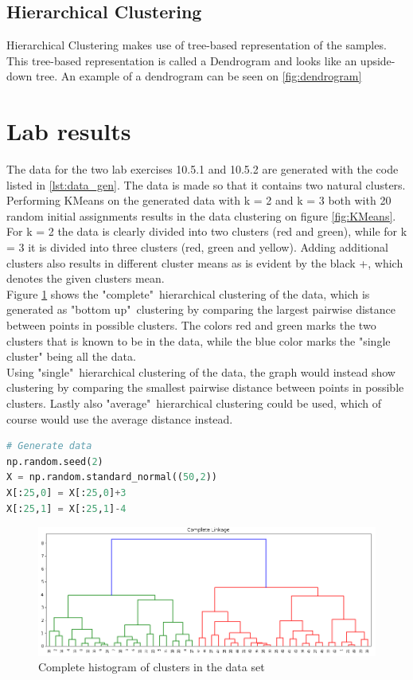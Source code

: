 \subsection{Hierarchical Clustering}
Hierarchical Clustering makes use of tree-based representation of the samples. This tree-based representation is called a Dendrogram and looks like an upside-down tree. An example of a dendrogram can be seen on \cref{fig:dendrogram}\cite{book_2015}


\section{Lab results}

The data for the two lab exercises 10.5.1 and 10.5.2 are generated with the code listed in \ref{lst:data_gen}. The data is made so that it contains two natural clusters.\\ 
Performing KMeans on the generated data with k = 2 and k = 3 both with 20 random initial assignments results in the data clustering on figure \ref{fig:KMeans}. For k = 2 the data is clearly divided into two clusters (red and green), while for k = 3 it is divided into three clusters (red, green and yellow). Adding additional clusters also results in different cluster means as is evident by the black +, which denotes the given clusters mean.\\
Figure \ref{fig:HC_Complete} shows the "complete"\ hierarchical clustering of the data, which is generated as "bottom up"\ clustering by comparing the largest pairwise distance between points in possible clusters. The colors red and green marks the two clusters that is known to be in the data, while the blue color marks the "single cluster" being all the data.\\ 
Using "single"\ hierarchical clustering of the data, the graph would instead show clustering by comparing the smallest pairwise distance between points in possible clusters. Lastly also "average"\ hierarchical clustering could be used, which of course would use the average distance instead.


\begin{lstlisting}[language=Python, caption=Code for generating the data]
# Generate data
np.random.seed(2)
X = np.random.standard_normal((50,2))
X[:25,0] = X[:25,0]+3
X[:25,1] = X[:25,1]-4
\end{lstlisting}\label{lst:data_gen}


\begin{figure}[H]
	\centering
	\includegraphics[width=14cm]{Img/HC_Complete.PNG}
	\caption{Complete histogram of clusters in the data set}
	\label{fig:HC_Complete}
\end{figure}

